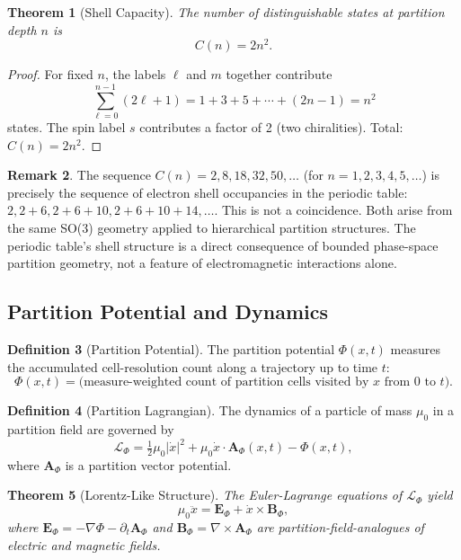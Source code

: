 \documentclass[11pt,twocolumn,a4paper]{article}
\newtheorem{theorem}{Theorem}[section]
\theoremstyle{definition}
\newtheorem{definition}[theorem]{Definition}
\newtheorem{remark}[theorem]{Remark}
\newcommand{\calL}{\mathcal{L}}
\begin{document}
\begin{theorem}[Shell Capacity]
\label{thm:shell-capacity}
The number of distinguishable states at partition depth $n$ is
\begin{equation}
C(n) = 2n^2.
\end{equation}
\end{theorem}

\begin{proof}
For fixed $n$, the labels $\ell$ and $m$ together contribute
\[
\sum_{\ell=0}^{n-1}(2\ell+1) = 1+3+5+\cdots+(2n-1) = n^2
\]
states. The spin label $s$ contributes a factor of 2 (two chiralities). Total: $C(n) = 2n^2$.
\end{proof}

\begin{remark}
The sequence $C(n) = 2, 8, 18, 32, 50, \ldots$ (for $n=1,2,3,4,5,\ldots$) is precisely the sequence of electron shell occupancies in the periodic table: $2, 2+6, 2+6+10, 2+6+10+14, \ldots$. This is not a coincidence. Both arise from the same SO(3) geometry applied to hierarchical partition structures. The periodic table's shell structure is a direct consequence of bounded phase-space partition geometry, not a feature of electromagnetic interactions alone.
\end{remark}

\subsection{Partition Potential and Dynamics}

\begin{definition}[Partition Potential]
The partition potential $\Phi(x, t)$ measures the accumulated cell-resolution count along a trajectory up to time $t$:
\[
\Phi(x,t) = \text{(measure-weighted count of partition cells visited by } x \text{ from } 0 \text{ to } t).
\]
\end{definition}

\begin{definition}[Partition Lagrangian]
The dynamics of a particle of mass $\mu_0$ in a partition field are governed by
\[
\calL_\Phi = \tfrac{1}{2}\mu_0|\dot{x}|^2 + \mu_0\dot{x} \cdot \bm{A}_\Phi(x,t) - \Phi(x,t),
\]
where $\bm{A}_\Phi$ is a partition vector potential.
\end{definition}

\begin{theorem}[Lorentz-Like Structure]
\label{thm:lorentz}
The Euler-Lagrange equations of $\calL_\Phi$ yield
\[
\mu_0 \ddot{x} = \bm{E}_\Phi + \dot{x} \times \bm{B}_\Phi,
\]
where $\bm{E}_\Phi = -\nabla\Phi - \partial_t\bm{A}_\Phi$ and $\bm{B}_\Phi = \nabla \times \bm{A}_\Phi$ are partition-field-analogues of electric and magnetic fields.
\end{theorem}
\end{document}
